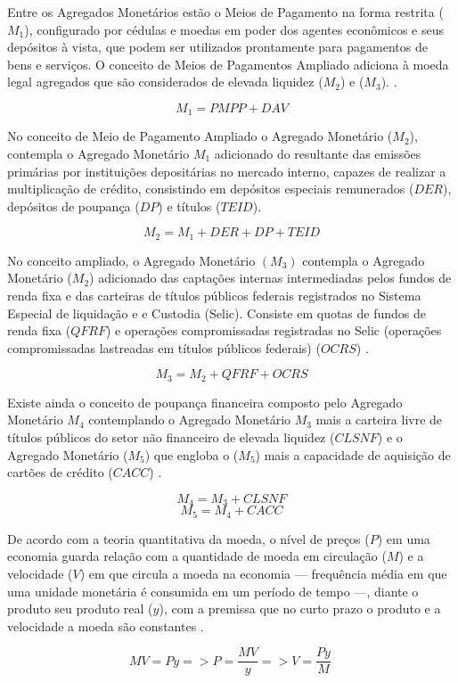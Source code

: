 \documentclass[12pt,12pt,openright,oneside,a4paper,chapter=TITLE,section=TITLE,subsection=TITLE,subsubsection=TITLE english,french,spanish,portugues,sumario=tradicional]{abntex2}
\begin{document}
Entre os Agregados Monetários estão o Meios de Pagamento na forma restrita (\(M_1\)), configurado por cédulas e moedas em poder dos agentes econômicos e seus depósitos à vista, que podem ser utilizados prontamente para pagamentos de bens e serviços. O conceito de Meios de Pagamentos Ampliado adiciona à moeda legal agregados que são considerados de elevada liquidez (\(M_2\)) e (\(M_3\)). \cite{bcb:2019}.

\[
M_1 = PMPP + DAV
\]

No conceito de Meio de Pagamento Ampliado o Agregado Monetário (\(M_2\)), contempla o Agregado Monetário \(M_1\) adicionado do resultante das emissões primárias por instituições depositárias no mercado interno, capazes de realizar a multiplicação de crédito, consistindo em depósitos especiais remunerados (\(DER\)), depósitos de poupança (\(DP\)) e títulos (\(TEID\)).

\[
M_2 = M_1 + DER + DP + TEID
\]

No conceito ampliado, o Agregado Monetário \((M_3)\) contempla o Agregado Monetário (\(M_2\)) adicionado das captações internas intermediadas pelos fundos de renda fixa e das carteiras de títulos públicos federais registrados no Sistema Especial de liquidação e e Custodia (Selic). Consiste em quotas de fundos de renda fixa (\(QFRF\)) e operações compromissadas registradas no Selic (operações compromissadas lastreadas em títulos públicos federais) (\(OCRS\)) \cite{bcb:2019}.

\[
M_3 = M_2 + QFRF + OCRS
\]

Existe ainda o conceito de poupança financeira composto pelo Agregado Monetário \(M_4\) contemplando o Agregado Monetário \(M_3\) mais a carteira livre de títulos públicos do setor não financeiro de elevada liquidez (\(CLSNF\)) \cite{bcb:2019} e o Agregado Monetário (\(M_5\)) que engloba o (\(M_5\)) mais a capacidade de aquisição de cartões de crédito (\(CACC\)) .

\[
M_4 = M_3 + CLSNF
\]
\[
M_5 = M_4 + CACC
\]

De acordo com a teoria quantitativa da moeda, o nível de preços (\(P\)) em uma economia guarda relação com a quantidade de moeda em circulação (\(M\)) e a velocidade (\(V\)) em que circula a moeda na economia --- frequência média em que uma unidade monetária é consumida em um período de tempo ---, diante o produto seu produto real (\(y\)), com a premissa que no curto prazo o produto e a velocidade a moeda são constantes \cite{vasconcellos:2011}.

\[
MV = Py => P = \frac{MV}{y} => V = \frac{Py}{M}\
\]
\end{document}
